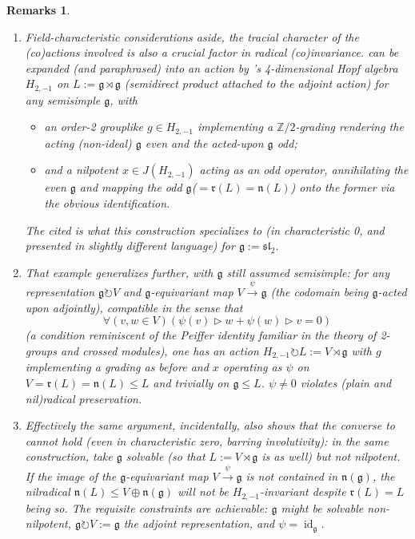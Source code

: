 \documentclass[11pt,leqno]{article}
\theoremstyle{plain}
\theoremstyle{plain}
\theoremstyle{plain}
\newtheorem{remarks}[lemma]{Remarks}
\numberwithin{equation}{section}
\theoremstyle{nonumberplain}
\newcommand\bZ{{\mathbb Z}}
\newcommand\fg{{\mathfrak g}}
\newcommand\fn{{\mathfrak n}}
\newcommand\fr{{\mathfrak r}}
\newcommand\fsl{\mathfrak{sl}}
\newcommand\1{{\bf 1}}
\DeclareMathOperator{\id}{id}
\begin{document}
\begin{remarks}\label{res:trc:nec}
  \begin{enumerate}[(1),wide]
  \item Field-characteristic considerations aside, the tracial character of the (co)actions involved is also a crucial factor in radical (co)invariance. \cite[Example 2.8]{MR3115171} can be expanded (and paraphrased) into an action by \cite[\S 7.3]{rad}'s 4-dimensional Hopf algebra $H_{2,-1}$ on $L:=\fg\rtimes \fg$ (semidirect product attached to the adjoint action) for any semisimple $\fg$, with
    \begin{itemize}[wide]
    \item an order-2 \emph{grouplike} \cite[Deﬁnition 2.1.10]{rad} $g\in H_{2,-1}$ implementing a $\bZ/2$-grading rendering the acting (non-ideal) $\fg$ even and the acted-upon $\fg$ odd;
    \item and a nilpotent $x\in J(H_{2,-1})$ acting as an odd operator, annihilating the even $\fg$ and mapping the odd $\fg$($=\fr(L)=\fn(L)$) onto the former via the obvious identification. 
    \end{itemize}
    The cited \cite[Example 2.8]{MR3115171} is what this construction specializes to (in characteristic 0, and presented in slightly different language) for $\fg:=\fsl_2$.

  \item That example generalizes further, with $\fg$ still assumed semisimple: for \emph{any} representation $\fg\circlearrowright V$ and $\fg$-equivariant map $V\xrightarrow{\psi}\fg$ (the codomain being $\fg$-acted upon adjointly), compatible in the sense that
    \begin{equation*}
      \forall\left(v,w\in V\right)
      \left(
        \psi(v)\triangleright w+\psi(w)\triangleright v=0
      \right)
    \end{equation*}
    (a condition reminiscent of the \emph{Peiffer identity} \cite[p.462]{MR2068521} familiar in the theory of 2-groups and crossed modules), one has an action $H_{2,-1}\circlearrowright L:=V\rtimes \fg$ with $g$ implementing a grading as before and $x$ operating as $\psi$ on $V=\fr(L)=\fn(L)\le L$ and trivially on $\fg\le L$. $\psi\ne 0$ violates (plain and nil)radical preservation.
    
  \item\label{item:res:trc:nec:solv.inv.nil.ninv} Effectively the same argument, incidentally, also shows that the converse to  cannot hold (even in characteristic zero, barring involutivity): in the same construction, take $\fg$ solvable (so that $L:=V\rtimes \fg$ is as well) but not nilpotent. If the image of the $\fg$-equivariant map $V\xrightarrow{\psi}\fg$ is not contained in $\fn(\fg)$, the nilradical $\fn(L)\le V\oplus \fn(\fg)$ will not be $H_{2,-1}$-invariant despite $\fr(L)=L$ being so. The requisite constraints are achievable: $\fg$ might be solvable non-nilpotent, $\fg\circlearrowright V:=\fg$ the adjoint representation, and $\psi=\id_{\fg}$. 
  \end{enumerate}
\end{remarks}
\end{document}
